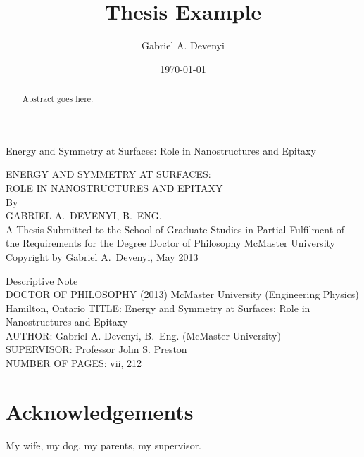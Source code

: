 \documentclass[letterpaper,10pt,twoside]{report}
\title{Thesis Example}
\author{Gabriel A. Devenyi}
\date{\today}
\begin{document}
\begin{titlepage} %
	\vspace*{\fill}\Centering
	Energy and Symmetry at Surfaces: Role in Nanostructures and Epitaxy
	\vspace*{\fill}
\end{titlepage}
\begin{titlepage} %
\Centering
\vspace*{\fill} %
{\Large ENERGY AND SYMMETRY AT SURFACES:\\ROLE IN NANOSTRUCTURES AND EPITAXY\\
By\\GABRIEL A.\ DEVENYI, B.\ ENG.\\}
\vfill 
A Thesis Submitted to the School of Graduate Studies in Partial Fulfilment of 
the Requirements for the Degree Doctor of Philosophy
McMaster University
\vfill%
\textcopyright Copyright by Gabriel A.\ Devenyi, May 2013
\end{titlepage}
\setcounter{page}{2} %
{\Large Descriptive Note\\
DOCTOR OF PHILOSOPHY (2013) McMaster University
(Engineering Physics)
Hamilton, Ontario
TITLE: Energy and Symmetry at Surfaces: Role in Nanostructures and Epitaxy\\
AUTHOR: Gabriel A. Devenyi, B.\ Eng. (McMaster University)\\
SUPERVISOR: Professor John S. Preston\\
NUMBER OF PAGES: vii, 212}
	\begin{abstract}
		\thispagestyle{plain}
		\setcounter{page}{3}
			Abstract goes here.
	\end{abstract}
	\setcounter{page}{4}
	\chapter*{Acknowledgements}
	My wife, my dog, my parents, my supervisor.
	\newpage

	\tableofcontents
	\listoffigures
	\listoftables
	\newpage
\end{document}
